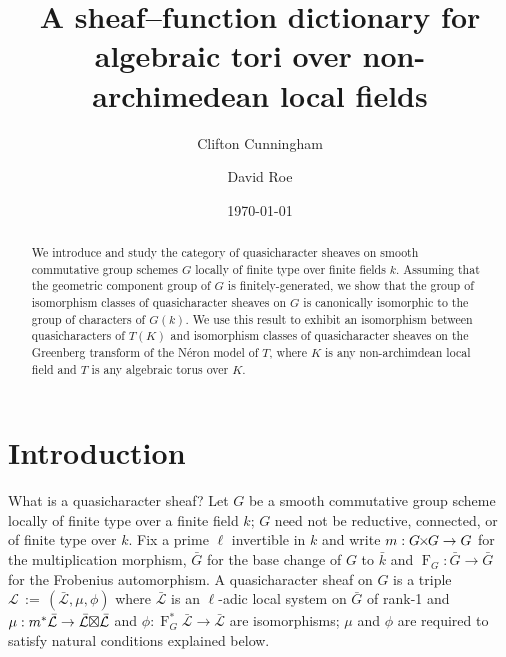 \documentclass[11pt]{amsart}
\title[Sheaf--function dictionary for local tori]{A sheaf--function dictionary for algebraic tori over non-archimedean local fields}
\date{\today}
\author{Clifton Cunningham}
\author{David Roe}
\theoremstyle{plain}
\theoremstyle{definition}
\theoremstyle{remark}
\newcommand{\bFq}{\bar{k}}
\newcommand{\Fq}{k}
\newcommand{\Frob}[1]{\operatorname{F}_{#1}}
\newcommand{\ceq}{{\, :=\, }}
\newcommand{\cs}[1]{{\mathcal{#1}}}
\newcommand{\gcs}[1]{{\mathcal{\bar #1}}}
\newcommand{\bG}{\bar{G}}
\newcommand{\tight}[3]{\hspace{-#1pt}{#2}\hspace{-#3pt}}
\newcommand{\GxG}{\text{$G \tight{1}{\times}{1} G$}}
\newcommand{\LxL}{\text{$\gcs{L} \tight{0}{\boxtimes}{0} \gcs{L}$}}
\begin{document}
\begin{abstract}
  We introduce and study the category of quasicharacter sheaves on smooth commutative
  group schemes $G$ locally of finite type over finite fields
  $\Fq$. Assuming that the geometric component group of $G$
  is finitely-generated, we show that the group of isomorphism classes
  of quasicharacter sheaves on $G$ is canonically isomorphic to the group
  of characters of $G(\Fq)$. We use this result to exhibit an
  isomorphism between quasicharacters of $T(K)$ and isomorphism
  classes of quasicharacter sheaves on the Greenberg transform of the Néron
  model of $T$, where $K$ is any non-archimdean local field and $T$ is
  any algebraic torus over $K$.
\end{abstract}

\maketitle

\section*{Introduction}

%
What is a quasicharacter sheaf?
Let $G$ be a smooth commutative group scheme locally of finite
type over a finite field $\Fq$; $G$ need not be reductive, connected, or of
finite type over $\Fq$. Fix a prime $\ell$ invertible in $\Fq$
and write $m : \GxG \to G$ for the multiplication morphism,
$\bG$ for the base change of $G$ to $\bFq$ and
$\Frob{G} : \bG \to \bG$ for the Frobenius automorphism.
A quasicharacter sheaf on $G$ is a triple $\cs{L}\ceq
(\gcs{L},\mu,\phi)$ where $\gcs{L}$ is an $\ell$-adic local system on $\bG$ of rank-1 and $\mu: m^*
\gcs{L} \to \LxL$ and $\phi : \Frob{G}^*\gcs{L} \to \gcs{L}$ are isomorphisms;
$\mu$ and $\phi$ are required to satisfy natural conditions explained below.
\end{document}

